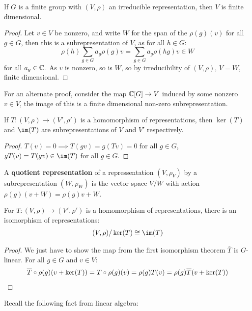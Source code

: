 \documentclass{article}
\begin{document}
\begin{proposition}
    If $G$ is a finite group with $(V,\rho)$ an irreducible representation, then $V$ is finite dimensional.
    \begin{proof}
        Let $v\in V$ be nonzero, and write $W$ for the span of the $\rho(g)(v)$ for all $g\in G$, then this is a subrepresentation of $V$, as for all $h\in G$:\[
            \rho(h)\sum_{g\in G}a_g\rho(g)v = \sum_{g\in G}a_g\rho(hg)v\in W
        \] for all $a_g\in \mathbb{C}$. As $v$ is nonzero, so is $W$, so by irreducibility of $(V,\rho)$, $V=W$, finite dimensional.
    \end{proof}
\end{proposition}

For an alternate proof, consider the map $\mathbb{C}[G]\rightarrow V$ induced by some nonzero $v\in V$, the image of this is a finite dimensional non-zero subrepresentation.

\begin{proposition}
    If $T:(V,\rho)\rightarrow(V',\rho')$ is a homomorphism of representations, then $\ker(T)$ and $\im(T)$ are subrepresentations of $V$ and $V'$ respectively.
    \begin{proof}
        $T(v)=0\implies T(gv)=g(Tv)=0$ for all $g\in G$, $gT(v)=T(gv)\in\im(T)$ for all $g\in G$.
    \end{proof}
\end{proposition}

\begin{definition}
    A \textbf{quotient representation} of a repressentation $(V,\rho_V)$ by a subrepresentation $(W,\rho_W)$ is the vector space $V/W$ with action $\rho(g)(v+W)=\rho(g)v + W$.
\end{definition}

\begin{proposition}
    For $T:(V,\rho)\rightarrow(V',\rho')$ is a homomorphism of representations, there is an isomorphism of representations: \[
        (V,\rho)/\ker(T) \cong \im(T)
    \]\begin{proof}
        We just have to show the map from the first isomorphism theorem $\overline{T}$ is $G$-linear. For all $g\in G$ and $v\in V$:\[
            \overline{T}\circ\rho(g)(v+\ker(T)) = T\circ\rho(g)(v) = \rho(g)T(v) = \rho(g)\overline{T}(v+\ker(T))\qedhere
        \]
    \end{proof}
\end{proposition}

Recall the following fact from linear algebra:
\end{document}
